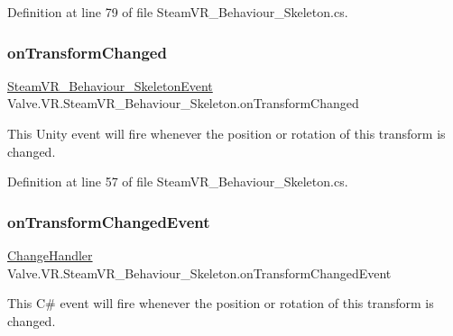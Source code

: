 Definition at line 79 of file Steam\+V\+R\+\_\+\+Behaviour\+\_\+\+Skeleton.\+cs.

\mbox{\label{class_valve_1_1_v_r_1_1_steam_v_r___behaviour___skeleton_a8078be6c149808098657e2bc9fcdd0c3}} 
\subsubsection{\texorpdfstring{onTransformChanged}{onTransformChanged}}
{\footnotesize\ttfamily \mbox{\hyperlink{class_valve_1_1_v_r_1_1_steam_v_r___behaviour___skeleton_event}{Steam\+V\+R\+\_\+\+Behaviour\+\_\+\+Skeleton\+Event}} Valve.\+V\+R.\+Steam\+V\+R\+\_\+\+Behaviour\+\_\+\+Skeleton.\+on\+Transform\+Changed}



This Unity event will fire whenever the position or rotation of this transform is changed. 



Definition at line 57 of file Steam\+V\+R\+\_\+\+Behaviour\+\_\+\+Skeleton.\+cs.

\mbox{\label{class_valve_1_1_v_r_1_1_steam_v_r___behaviour___skeleton_a2fc1a43e773dc875c4d0364ab313eb7b}} 
\subsubsection{\texorpdfstring{onTransformChangedEvent}{onTransformChangedEvent}}
{\footnotesize\ttfamily \mbox{\hyperlink{class_valve_1_1_v_r_1_1_steam_v_r___behaviour___skeleton_ab2e28cae75fa463e2dcbeccd01607c48}{Change\+Handler}} Valve.\+V\+R.\+Steam\+V\+R\+\_\+\+Behaviour\+\_\+\+Skeleton.\+on\+Transform\+Changed\+Event}



This C\# event will fire whenever the position or rotation of this transform is changed. 



